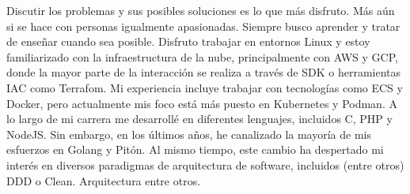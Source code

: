

%
\begin{cventries}

  \cventry
  {}
  {}
  {}
  {}
  {Discutir los problemas y sus posibles soluciones es lo que más disfruto. Más aún si se hace con personas igualmente apasionadas. Siempre busco aprender y tratar de enseñar cuando sea posible. Disfruto trabajar en entornos Linux y estoy familiarizado con la infraestructura de la nube, principalmente con AWS y GCP, donde la mayor parte de la interacción se realiza a través de SDK o herramientas IAC como Terrafom. Mi experiencia incluye trabajar con tecnologías como ECS y Docker, pero actualmente mis foco está más puesto en Kubernetes y Podman. A lo largo de mi carrera me desarrollé en diferentes lenguajes, incluidos C, PHP y NodeJS. Sin embargo, en los últimos años, he canalizado la mayoría de mis esfuerzos en Golang y Pitón. Al mismo tiempo, este cambio ha despertado mi interés en diversos paradigmas de arquitectura de software, incluidos (entre otros) DDD o Clean. Arquitectura entre otros.}
\end{cventries}
